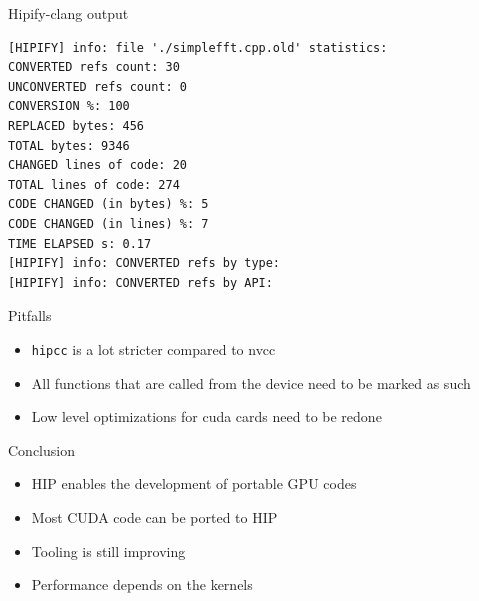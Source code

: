 \documentclass[aspectratio=169]{beamer}
\begin{document}
\begin{frame}[fragile]{Hipify-clang output}

\begin{verbatim}
[HIPIFY] info: file './simplefft.cpp.old' statistics:
CONVERTED refs count: 30
UNCONVERTED refs count: 0
CONVERSION %: 100
REPLACED bytes: 456
TOTAL bytes: 9346
CHANGED lines of code: 20
TOTAL lines of code: 274
CODE CHANGED (in bytes) %: 5
CODE CHANGED (in lines) %: 7
TIME ELAPSED s: 0.17
[HIPIFY] info: CONVERTED refs by type:
[HIPIFY] info: CONVERTED refs by API:
\end{verbatim}
\end{frame}

\begin{frame}{Pitfalls}
\begin{itemize}
    \item \texttt{hipcc} is a lot stricter compared to nvcc
    \item All functions that are called from the device need to be marked as such
    \item Low level optimizations for cuda cards need to be redone
\end{itemize}
\end{frame}

\begin{frame}[fragile]{Conclusion}
\begin{itemize}
    \item HIP enables the development of portable GPU codes
    \item Most CUDA code can be ported to HIP
    \item Tooling is still improving
    \item Performance depends on the kernels
\end{itemize}
\end{frame}
\end{document}
